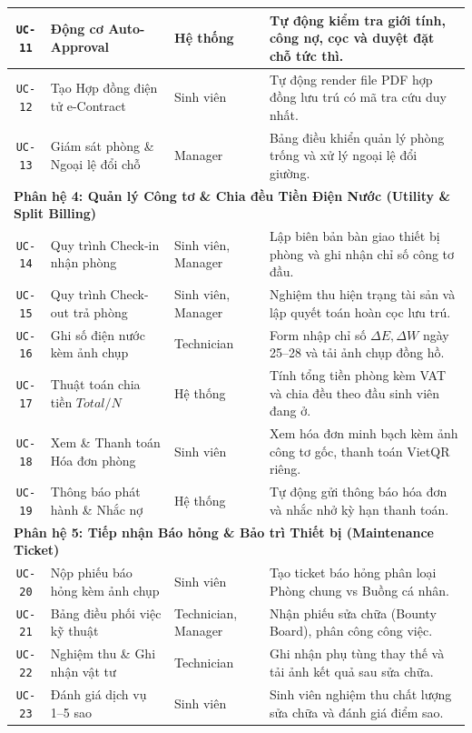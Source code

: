 \documentclass[12pt,a4paper,oneside]{report}
\begin{document}
\begin{table}[htbp]
\begin{tabularx}{\textwidth}{|c|l|l|X|}
\texttt{UC-11} & Động cơ Auto-Approval & Hệ thống & Tự động kiểm tra giới tính, công nợ, cọc và duyệt đặt chỗ tức thì. \\ \hline
\texttt{UC-12} & Tạo Hợp đồng điện tử e-Contract & Sinh viên & Tự động render file PDF hợp đồng lưu trú có mã tra cứu duy nhất. \\ \hline
\texttt{UC-13} & Giám sát phòng \& Ngoại lệ đổi chỗ & Manager & Bảng điều khiển quản lý phòng trống và xử lý ngoại lệ đổi giường. \\ \hline
\multicolumn{4}{|l|}{\textbf{Phân hệ 4: Quản lý Công tơ \& Chia đều Tiền Điện Nước (Utility \& Split Billing)}} \\ \hline
\texttt{UC-14} & Quy trình Check-in nhận phòng & Sinh viên, Manager & Lập biên bản bàn giao thiết bị phòng và ghi nhận chỉ số công tơ đầu. \\ \hline
\texttt{UC-15} & Quy trình Check-out trả phòng & Sinh viên, Manager & Nghiệm thu hiện trạng tài sản và lập quyết toán hoàn cọc lưu trú. \\ \hline
\texttt{UC-16} & Ghi số điện nước kèm ảnh chụp & Technician & Form nhập chỉ số $\Delta E, \Delta W$ ngày 25--28 và tải ảnh chụp đồng hồ. \\ \hline
\texttt{UC-17} & Thuật toán chia tiền $Total / N$ & Hệ thống & Tính tổng tiền phòng kèm VAT và chia đều theo đầu sinh viên đang ở. \\ \hline
\texttt{UC-18} & Xem \& Thanh toán Hóa đơn phòng & Sinh viên & Xem hóa đơn minh bạch kèm ảnh công tơ gốc, thanh toán VietQR riêng. \\ \hline
\texttt{UC-19} & Thông báo phát hành \& Nhắc nợ & Hệ thống & Tự động gửi thông báo hóa đơn và nhắc nhở kỳ hạn thanh toán. \\ \hline
\multicolumn{4}{|l|}{\textbf{Phân hệ 5: Tiếp nhận Báo hỏng \& Bảo trì Thiết bị (Maintenance Ticket)}} \\ \hline
\texttt{UC-20} & Nộp phiếu báo hỏng kèm ảnh chụp & Sinh viên & Tạo ticket báo hỏng phân loại Phòng chung vs Buồng cá nhân. \\ \hline
\texttt{UC-21} & Bảng điều phối việc kỹ thuật & Technician, Manager & Nhận phiếu sửa chữa (Bounty Board), phân công công việc. \\ \hline
\texttt{UC-22} & Nghiệm thu \& Ghi nhận vật tư & Technician & Ghi nhận phụ tùng thay thế và tải ảnh kết quả sau sửa chữa. \\ \hline
\texttt{UC-23} & Đánh giá dịch vụ 1--5 sao & Sinh viên & Sinh viên nghiệm thu chất lượng sửa chữa và đánh giá điểm sao. \\ \hline

\end{tabularx}
\end{table}
\end{document}
